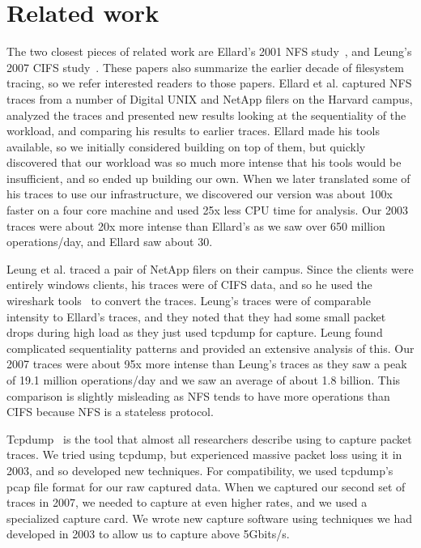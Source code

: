 \section{Related work}
\label{sec:related}

The two closest pieces of related work are Ellard's 2001 NFS
study~\cite{EllardFast03}, and Leung's 2007 CIFS
study~\cite{LeungUsenix08}.  These papers also summarize the earlier
decade of filesystem tracing, so we refer interested readers to those
papers.  Ellard et al. captured NFS traces from a number of Digital
UNIX and NetApp filers on the Harvard campus, analyzed the traces and
presented new results looking at the sequentiality of the workload,
and comparing his results to earlier traces.  Ellard made his tools
available, so we initially considered building on top of them, but
quickly discovered that our workload was so much more intense that his
tools would be insufficient, and so ended up building our own.
When we later translated some of his traces to use our infrastructure, we
discovered our version was about 100x faster on a four core machine and
used 25x less CPU time for analysis.  Our 2003 traces were about 20x
more intense than Ellard's as we saw over 650 million operations/day,
and Ellard saw about 30.

Leung et al. traced a pair of NetApp filers on their campus.
Since the clients were entirely windows clients, his traces were of
CIFS data, and so he used the wireshark tools~\cite{wireshark} to
convert the traces.  Leung's traces were of comparable intensity to
Ellard's traces, and they noted that they had some small packet drops
during high load as they just used tcpdump for capture.  Leung found
complicated sequentiality patterns and provided an extensive analysis
of this.  Our 2007 traces were about 95x more intense than Leung's
traces as they saw a peak of 19.1 million operations/day and we saw an
average of about 1.8 billion.  This comparison is slightly misleading
as NFS tends to have more operations than CIFS because NFS is a
stateless protocol.

Tcpdump~\cite{tcpdump} is the tool that almost all researchers describe using to capture packet
traces.  We tried using tcpdump, but experienced massive
packet loss using it in 2003, and so developed new techniques.  For
compatibility, we used tcpdump's pcap file format for our raw captured
data.  When we captured our second set of traces in 2007, we needed to
capture at even higher rates, and we used a
specialized capture card. We wrote new capture software using
techniques we had developed in 2003 to allow us to capture above
5Gbits/s.

